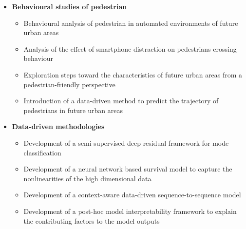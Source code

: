 \begin{itemize}
    \item \textbf{Behavioural studies of pedestrian}
    \begin{itemize}
    \item Behavioural analysis of pedestrian in automated environments of future urban areas
    \item Analysis of the effect of smartphone distraction on pedestrians crossing behaviour
    \item Exploration steps toward the characteristics of future urban areas from a pedestrian-friendly perspective
    \item Introduction of a data-driven method to predict the trajectory of pedestrians in future urban areas
\end{itemize}
\end{itemize}

 \begin{itemize}
    \item \textbf{Data-driven methodologies}
    \begin{itemize}
      \item Development of a semi-supervised deep residual framework for mode classification
      \item Development of a neural network based survival model to capture the nonlinearities of the high dimensional data
      \item Development of a context-aware data-driven sequence-to-sequence model 
      \item Development of a post-hoc model interpretability framework to explain the contributing factors to the model outputs
    \end{itemize}

\end{itemize}  
    

    
   

